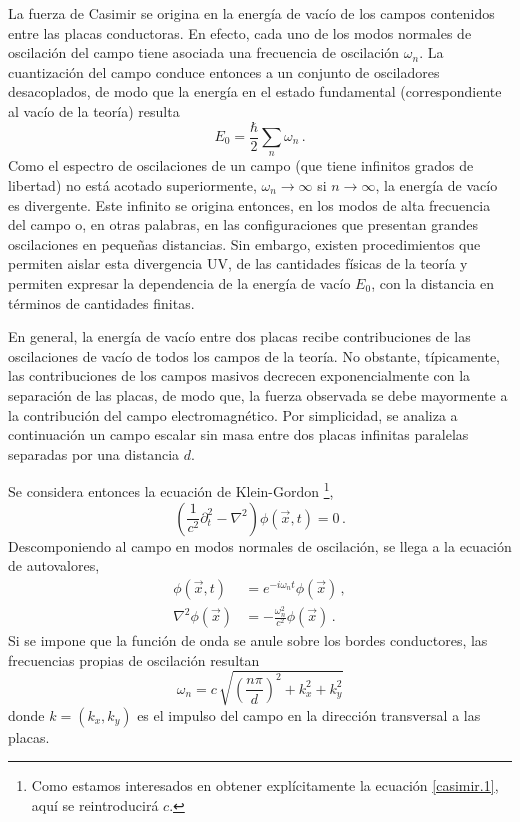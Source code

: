 La fuerza de Casimir se origina en la energía de vacío de los campos contenidos entre las placas conductoras. En efecto, cada uno de los modos normales de oscilación del campo tiene asociada una frecuencia de oscilación $\omega_n$. La cuantización del campo conduce entonces a un conjunto de osciladores desacoplados, de modo que la energía en el estado fundamental (correspondiente al vacío de la teoría) resulta
\begin{equation}
E _0 = \frac{\hbar}{2} \sum _n \omega _n\,.
\label{eq.casimir.div}
\end{equation}
Como el espectro de oscilaciones de un campo (que tiene infinitos grados de libertad) no está acotado superiormente, $\omega_n\to\infty$ si $n\to\infty$, la energía de vacío es divergente. Este infinito se origina entonces, en los modos de alta frecuencia del campo o, en otras palabras, en las configuraciones que presentan grandes oscilaciones en pequeñas distancias. Sin embargo, existen procedimientos que permiten aislar esta divergencia UV, de las cantidades físicas de la teoría y permiten expresar la dependencia de la energía de vacío $E_0$, con la distancia en términos de cantidades finitas.

En general, la energía de vacío entre dos placas recibe contribuciones de las oscilaciones de vacío de todos los campos de la teoría. No obstante, típicamente, las contribuciones de los campos masivos decrecen exponencialmente con la separación de las placas, de modo que, la fuerza observada se debe mayormente a la contribución del campo electromagnético. Por simplicidad, se analiza a continuación un campo escalar sin masa entre dos placas infinitas paralelas separadas por una distancia $d$.



Se considera entonces la ecuación de Klein-Gordon \footnote{Como estamos interesados en obtener explícitamente la ecuación \ref{casimir.1}, aquí se reintroducirá $c$.},
\begin{equation}
\left( \frac{1}{c^2} \partial _t ^2 - \nabla  ^2  \right) \phi (\vec{x} ,t) = 0 \,.
\end{equation}
Descomponiendo al campo en modos normales de oscilación, se llega a la ecuación de autovalores,
\begin{align}
\phi ( \vec{x},t) &= e ^{-i \omega _n t} \phi ( \vec{x}) \,,\\
\nabla ^2 \phi ( \vec{x}) &= - \frac{\omega _n ^2}{c ^2} \phi ( \vec{x})\,.
\end{align}
Si se impone que la función de onda se anule sobre los bordes conductores, las frecuencias propias de oscilación resultan
\begin{equation}
\omega _n = c\, \sqrt{ \left( \frac{n \pi}{d} \right) ^2 + k _x ^2 + k _y ^2   }
\end{equation}
donde $k=(k_x,k_y)$ es el impulso del campo en la dirección transversal a las placas.

